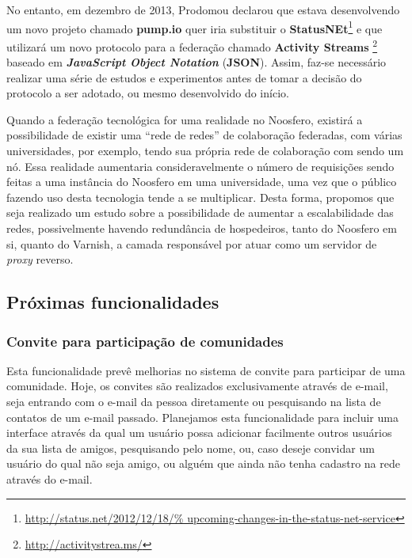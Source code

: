 No entanto, em dezembro de 2013, Prodomou declarou que estava desenvolvendo
um novo projeto chamado \textbf{pump.io} quer iria substituir o
\textbf{StatusNEt}\footnote{\url{http://status.net/2012/12/18/%
upcoming-changes-in-the-status-net-service}} e que utilizará um novo
protocolo para a federação chamado \textbf{Activity Streams}%
\footnote{\url{http://activitystrea.ms/}} baseado em \textbf{\textit{%
JavaScript Object Notation}} (\textbf{JSON}).
%
Assim, faz-se necessário realizar uma série de estudos e experimentos
antes de tomar a decisão do protocolo a ser adotado, ou mesmo desenvolvido
do início.

Quando a federação tecnológica for uma realidade no Noosfero, existirá a
possibilidade de existir uma ``rede de redes'' de colaboração federadas,
com várias universidades, por exemplo, tendo sua própria rede de colaboração
com sendo um nó.
%
Essa realidade aumentaria consideravelmente o número de requisições sendo
feitas a uma instância do Noosfero em uma universidade, uma vez que o público
fazendo uso desta tecnologia tende a se multiplicar.
%
Desta forma, propomos que seja realizado um estudo sobre a possibilidade
de aumentar a escalabilidade das redes, possivelmente havendo redundância
de hospedeiros, tanto do Noosfero em si, quanto do Varnish, a camada
responsável por atuar como um servidor de \textit{proxy} reverso.


\subsection{Próximas funcionalidades}

\subsubsection{Convite para participação de comunidades}

Esta funcionalidade prevê melhorias no sistema de convite para participar de
uma comunidade. Hoje, os convites são realizados
exclusivamente através de e-mail, seja entrando com o e-mail da pessoa
diretamente ou pesquisando na lista de contatos de um e-mail passado.
%
Planejamos esta funcionalidade para incluir uma interface através da qual um
usuário possa adicionar facilmente outros usuários da sua lista de amigos,
pesquisando pelo nome, ou, caso deseje convidar um usuário do qual não seja
amigo, ou alguém que ainda não tenha cadastro na rede através do e-mail.

